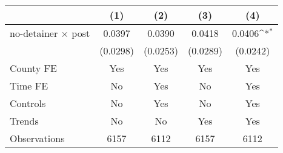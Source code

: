{
\def\sym#1{\ifmmode^{#1}\else\(^{#1}\)\fi}
\begin{tabular}{l*{4}{c}}
\hline\hline
                    &\multicolumn{1}{c}{(1)}         &\multicolumn{1}{c}{(2)}         &\multicolumn{1}{c}{(3)}         &\multicolumn{1}{c}{(4)}         \\
\hline
no-detainer $\times$ post&      0.0397         &      0.0390         &      0.0418         &      0.0406\sym{*}  \\
                    &    (0.0298)         &    (0.0253)         &    (0.0289)         &    (0.0242)         \\
[1em]
County FE           &         Yes         &         Yes         &         Yes         &         Yes         \\
[1em]
Time FE             &          No         &         Yes         &          No         &         Yes         \\
[1em]
Controls            &          No         &         Yes         &          No         &         Yes         \\
[1em]
Trends              &          No         &          No         &         Yes         &         Yes         \\
\hline
Observations        &        6157         &        6112         &        6157         &        6112         \\
\hline\hline
\end{tabular}
}
